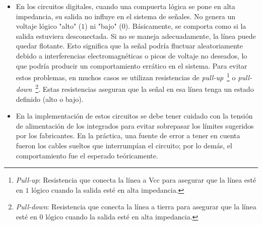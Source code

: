 \begin{itemize}
    \item En los circuitos digitales, cuando una compuerta lógica se pone en alta impedancia, su salida no influye en el sistema de señales. No genera un voltaje lógico "alto" ($1$) ni "bajo" ($0$). Básicamente, se comporta como si la salida estuviera desconectada. Si no se maneja adecuadamente, la línea puede quedar flotante. Esto significa que la señal podría fluctuar aleatoriamente debido a interferencias electromagnéticas o picos de voltaje no deseados, lo que podría producir un comportamiento errático en el sistema. Para evitar estos problemas, en muchos casos se utilizan resistencias de \textit{pull-up}~\footnote{\textit{Pull-up}: Resistencia que conecta la línea a Vcc para asegurar que la línea esté en $1$ lógico cuando la salida esté en alta impedancia.} o \textit{pull-down}~\footnote{\textit{Pull-down}: Resistencia que conecta la línea a tierra para asegurar que la línea esté en $0$ lógico cuando la salida esté en alta impedancia.}. Estas resistencias aseguran que la señal en esa línea tenga un estado definido (alto o bajo).
    \item En la implementación de estos circuitos se debe tener cuidado con la tensión de alimentación de los integrados para evitar sobrepasar los límites sugeridos por los fabricantes. En la práctica, una fuente de error a tener en cuenta fueron los cables sueltos que interrumpían el circuito; por lo demás, el comportamiento fue el esperado teóricamente.
\end{itemize}
